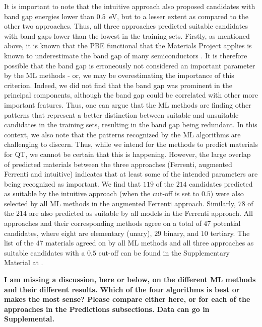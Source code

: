 \documentclass[superscriptaddress,unsortedaddress,
 amsmath,amssymb,
 aps,
]{revtex4-2}
\begin{document}
It is important to note that the intuitive approach also proposed candidates with band gap energies lower than $0.5$~eV, but to a lesser extent as compared to the other two approaches. Thus, all three approaches predicted suitable candidates with band gaps lower than the lowest in the training sets. 
Firstly, as mentioned above, it is known that the PBE functional that the Materials Project applies is known to underestimate the band gap of many semiconductors \cite{Freysoldt2014}. 
It is therefore possible that the band gap is erroneously not considered an important parameter by the ML methods - or, we may be overestimating the importance of this criterion. 
Indeed, we did not find that the band gap was prominent in the principal components, although the band gap could be correlated with other more important features. 
Thus, one can argue that the ML methods are finding other patterns that represent a better distinction between suitable and unsuitable candidates in the training sets, resulting in the band gap being redundant.
In this context, we also note that the patterns recognized by the ML algorithms are challenging to discern. Thus, while we intend for the methods to predict materials for QT, we cannot be certain that this is happening. 
However, the large overlap of predicted materials between the three approaches (Ferrenti, augmented Ferrenti and intuitive) indicates that at least some of the intended parameters are being recognized as important.
We find that $119$ of the $214$ candidates predicted as suitable by the intuitive approach (when the cut-off is set to $0.5$) were also selected by all ML methods in the augmented Ferrenti approach. 
Similarly, $78$ of the $214$ are also predicted as suitable by all models in the Ferrenti approach. All approaches and their corresponding methods agree on a total of $47$ potential candidates, where eight are elementary (unary), $29$ binary, and $10$ tertiary.
The list of the $47$ materials agreed on by all ML methods and all three approaches as suitable candidates with a $0.5$ cut-off can be found in the Supplementary Material at \cite{supplementary}. 

\textbf{I am missing a discussion, here or below, on the different ML methods and their different results. Which of the four algorithms is best or makes the most sense? Please compare either here, or for each of the approaches in the Predictions subsections. Data can go in Supplemental.}  
    
\end{document}
